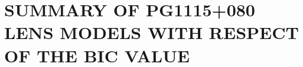 \documentclass[useAMS,usenatbib]{mnras}
\begin{document}
\section{SUMMARY OF PG1115+080 LENS MODELS WITH RESPECT OF THE BIC VALUE}
\label{appendix:pg_BIC}

\end{document}
